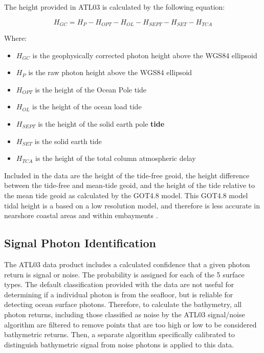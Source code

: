 The height provided in ATL03 is calculated by the following equation:

\[H_{GC} =  H_{P} - H_{OPT} - H_{OL} - H_{SEPT} - H_{SET} - H_{TCA}\]

Where:

\begin{itemize}

      \item \(H_{GC}\) is the geophysically corrected photon height above the WGS84 ellipsoid
      \item \(H_{P}\) is the raw photon height above the WGS84 ellipsoid
      \item \(H_{OPT}\) is the height of the Ocean Pole tide
      \item \(H_{OL}\) is the height of the ocean load tide
      \item \(H_{SEPT}\) is the height of the solid earth pole \textbf{tide}
      \item \(H_{SET}\) is the solid earth tide
      \item \(H_{TCA}\) is the height of the total column atmospheric delay
\end{itemize}

Included in the data are the height of the tide-free geoid, the height difference between the tide-free and mean-tide geoid, and the height of the tide relative to the mean tide geoid as calculated by the GOT4.8 model. This GOT4.8 model tidal height is a based on a low resolution model, and therefore is less accurate in nearshore coastal areas and within embayments \parencite{Neumann2019e}.

\subsection{Signal Photon Identification}

The ATL03 data product includes a calculated confidence that a given photon return is signal or noise. The probability is assigned for each of the 5 surface types. The default classification provided with the data are not useful for determining if a individual photon is from the seafloor, but is reliable for detecting ocean surface photons. Therefore, to calculate the bathymetry, all photon returns, including those classified as noise by the ATL03 signal/noise algorithm are filtered to remove points that are too high or low to be considered bathymetric returns. Then, a separate algorithm specifically calibrated to distinguish bathymetric signal from noise photons is applied to this data.

